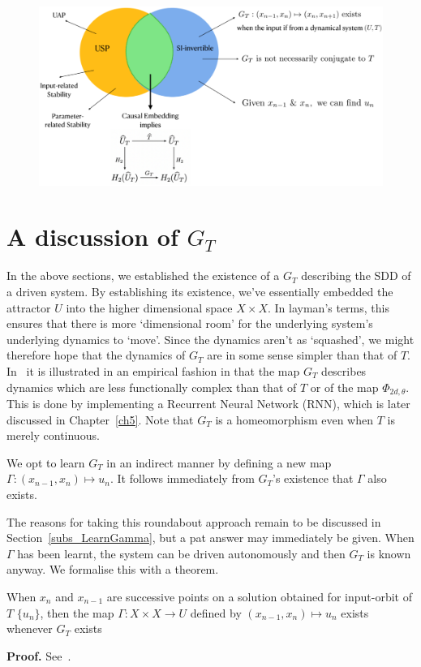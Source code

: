 \begin{figure}[ht]
  \includegraphics[width=0.7\linewidth]{Graphs/_summarypictorial.eps}
  \centering
\label{fig:pictorialSummary}
\end{figure}


\section{A discussion of $G_T$ }

In the above sections, we established the existence of a $G_T$ describing the SDD of a driven system. By establishing its existence, we’ve essentially embedded the attractor $U$ into the higher dimensional space $X\times{X}$.
In layman’s terms, this ensures that there is more `dimensional room' for the underlying system’s underlying dynamics to `move'. Since the dynamics aren’t as `squashed', we might therefore hope that the dynamics of $G_T$ are in some sense simpler than that of $T$. 
In~\cite{manjunath2021universal} it is illustrated in an empirical fashion in that the map $G_T$ describes dynamics which are less functionally complex than that of $T$ or of the map $\Phi_{2d,\theta}$. This is done by implementing a Recurrent Neural Network (RNN), which is later discussed in Chapter~\ref{ch5}.
Note that $G_T$ is a homeomorphism even when $T$ is merely continuous. 

We opt to learn $G_T$ in an indirect manner by defining a new map $\Gamma:(x_{n-1},x_n)\mapsto{u_n}$. It follows immediately from $G_T$’s existence that $\Gamma$ also exists. 

The reasons for taking this roundabout approach remain to be discussed in Section~\ref{subs_LearnGamma}, but a pat answer may immediately be given. When $\Gamma$ has been learnt, the system can be driven autonomously and then $G_T$ is known anyway. We formalise this with a theorem.

\begin{Theorem}
  When $x_n$ and $x_{n-1}$ are successive points on a solution obtained for input-orbit of $T$ $\{u_n\}$, then the map $\Gamma: X\times{X}\to{U}$ defined by $(x_{n-1},x_n)\mapsto{u_n}$ exists whenever $G_T$ exists 
\end{Theorem}
\vspace{-6mm}
{\bf Proof.}  See~\cite[Theorem. 3c]{manjunath2021universal}.

